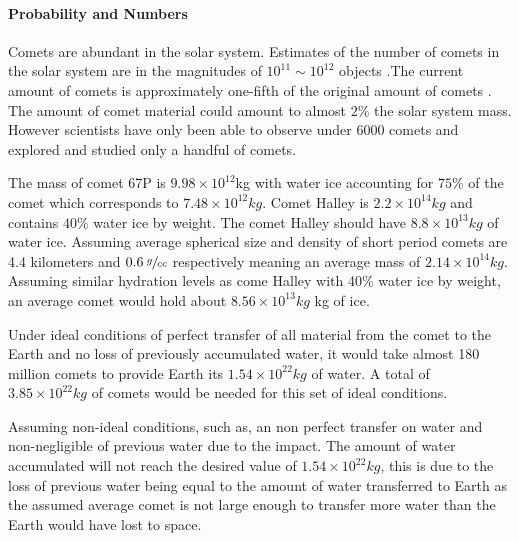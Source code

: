 \paragraph{Probability and Numbers}

Comets are abundant in the solar system. Estimates of the number of comets in the solar system are in the magnitudes of \(10^{11}\sim 10^{12}\) objects \cite{Comet_Num}.The current amount of comets is approximately one-fifth of the original amount of comets \cite{Comet_AvgSz}. The amount of comet material could amount to almost \(2\%\) \cite{Comet_AvgSz} the solar system mass. However scientists have only been able to observe under \(6000\) \cite{observed_objects} comets and explored and studied only a handful of comets.


The mass of comet 67P is \(9.98 \times 10^{12}\)kg \cite{67P_Mass} with water ice accounting for \(75\%\) \cite{67P_Water} of the comet which corresponds to \(7.48 \times 10^{12} kg\).
Comet Halley is \(2.2 \times 10^{14}kg\) \cite{Cevolani1987} and contains \(40\% \) water ice \cite{Comet_Yeomans} by weight. The comet Halley should have \(8.8 \times 10^{13} kg\) of water ice.
Assuming average spherical size and density of short period comets are 4.4 kilometers \cite{Comet_AvgSz} and \(0.6 \: \sfrac{g}{cc}\) \cite{Britt2006SmallBD} respectively meaning an average mass of \(2.14 \times 10^{14}kg\). Assuming similar hydration levels as come Halley with 40\% water ice by weight, an average comet would hold about \(8.56 \times 10^{13}kg\) kg of ice.

Under ideal conditions of perfect transfer of all material from the comet to the Earth and no loss of previously accumulated water, it would take almost 180 million comets to provide Earth its \(1.54\times 10^{22} kg\) of water. A total of \(3.85\times 10^{22} kg\) of comets would be needed for this set of ideal conditions.

Assuming non-ideal conditions, such as, an non perfect transfer on water and non-negligible of previous water  due to the impact. The amount of water accumulated will not reach the desired value of \(1.54\times 10^{22} kg\), this is due to the loss of previous water being equal to the amount of water transferred to Earth as the assumed average comet is not large enough to transfer more water than the Earth would have lost to space.

